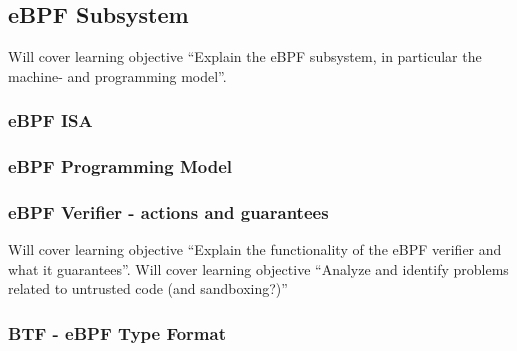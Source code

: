
\subsection{eBPF Subsystem}
\label{subsec:ebpf_subsystem}
Will cover learning objective ``Explain the eBPF subsystem, in particular the machine- and programming model''.

\subsubsection{eBPF ISA}
\subsubsection{eBPF Programming Model}
\subsubsection{eBPF Verifier - actions and guarantees}
Will cover learning objective ``Explain the functionality of the eBPF verifier and what it guarantees''.
Will cover learning objective ``Analyze and identify problems related to untrusted code (and sandboxing?)''

  





\subsubsection{BTF - eBPF Type Format}


